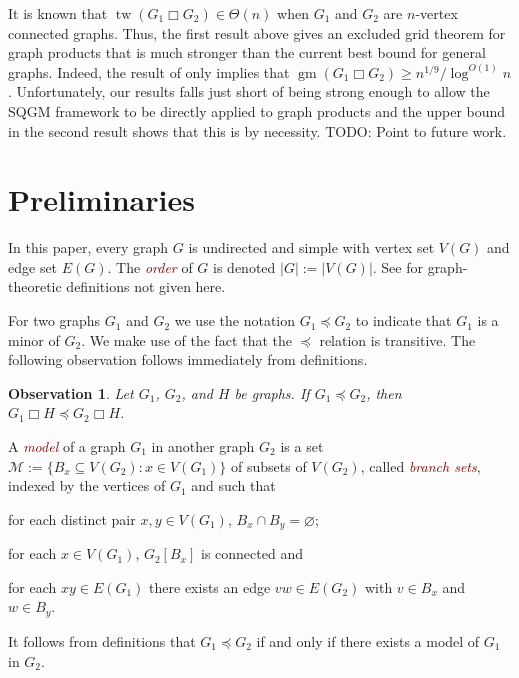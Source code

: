 \documentclass[lotsofwhite]{patmorin}
\newcommand{\defn}[1]{\textcolor{Maroon}{\emph{#1}}}
\newcommand{\boxprod}{\mathbin{\Box}}
\renewcommand{\emptyset}{\varnothing}
\renewcommand{\ge}{\geqslant}
\DeclareMathOperator{\tw}{tw}
\DeclareMathOperator{\gm}{gm}
\theoremstyle{plain}
\newtheorem{obs}[thm]{Observation}
\theoremstyle{definition}
\begin{document}
It is known that $\tw(G_1\boxprod G_2)\in\Theta(n)$ when $G_1$ and $G_2$ are $n$-vertex connected graphs.  Thus, the first result above gives an excluded grid theorem for graph products that is much stronger than the current best bound for general graphs. Indeed, the result of \cite{CT19} only implies that $\gm(G_1\boxprod G_2) \ge n^{1/9}/\log^{O(1)} n$.  Unfortunately, our results falls just short of being strong enough to allow the SQGM framework to be directly applied to graph products and the upper bound in the second result shows that this is by necessity.  TODO: Point to future work.

\section{Preliminaries}

In this paper, every graph $G$ is undirected and simple with vertex set $V(G)$ and edge set $E(G)$. The \defn{order} of $G$ is denoted $|G|:=|V(G)|$.
 See \citet{D10} for graph-theoretic definitions not given here.




For two graphs $G_1$ and $G_2$ we use the notation $G_1\preceq G_2$ to indicate that $G_1$ is a minor of $G_2$.  We make use of the fact that the $\preceq$ relation is transitive. The following observation follows immediately from definitions.

\begin{obs}\label{minor_product}
  Let $G_1$, $G_2$, and $H$ be graphs.  If $G_1\preceq G_2$, then $G_1\boxprod H\preceq G_2\boxprod H$.
\end{obs}

A \defn{model} of a graph $G_1$ in another graph $G_2$ is a set $\mathcal{M}:=\{B_x\subseteq V(G_2): x\in V(G_1)\}$ of subsets of $V(G_2)$, called \defn{branch sets}, indexed by the vertices of $G_1$ and such that
\begin{compactenum}[(i)]
  \item for each distinct pair $x,y\in V(G_1)$, $B_x\cap B_y=\emptyset$;
  \item for each $x\in V(G_1)$, $G_2[B_x]$ is connected and
  \item for each $xy\in E(G_1)$ there exists an edge $vw\in E(G_2)$ with $v\in B_x$ and $w\in B_y$.
\end{compactenum}
It follows from definitions that $G_1\preceq G_2$ if and only if there exists a model of $G_1$ in $G_2$.
\end{document}
